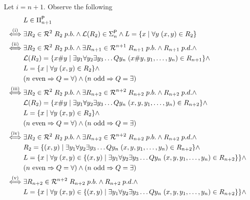 \documentclass [11pt]{article}
\newcommand{\ccfont}[1]{\protect\mathsf{#1}}
\newcommand{\Ptime}{\ccfont{P}}
\newcommand{\phs}[1]{\Sigma_{#1}^{\Ptime}}
\newcommand{\php}[1]{\Pi_{#1}^{\Ptime}}
\newcommand{\sto}{\Rightarrow}
\begin{document}
Let $i=n+1$. Observe the following
\begin{equation*}
\begin{split}
&L \in \php{n+1}\\
\stackrel{\text{(i)}}{\iff}& \exists R_2 \in \mathcal{R}^{2} \; R_2 \; p.b.  \land \mathcal{L}(R_2) \in \phs{n} \land L = \{x \mid \forall y \; (x,y) \in R_2\} \\
\stackrel{\text{(ii)}}{\iff} &\exists R_2 \in \mathcal{R}^{2} \; R_2 \; p.b.  \land  \exists R_{n+1}  \in  \mathcal{R}^{n+1} \; R_{n+1} \; p.b. \land R_{n+1} \; p.d. \land  \\
&\mathcal{L}(R_2) = \{x\#y \mid \exists y_1 \forall y_2\exists y_3\dots Q y_n  \; (x\#y,y_1,\ldots,y_n) \in R_{n+1}\}  \land \\
& L = \{x \mid \forall y \; (x,y) \in R_2\}  \land \\
&  (n \text{ even}  \sto Q=\forall )\land (n \text{ odd}  \sto Q=\exists )\\
\stackrel{\text{(iii)}}{\iff} &\exists R_2 \in \mathcal{R}^{2} \; R_2 \; p.b.  \land  \exists R_{n+2}  \in  \mathcal{R}^{n+2} \; R_{n+2} \; p.b. \land R_{n+2} \; p.d. \land  \\
&\mathcal{L}(R_2) = \{x\#y \mid \exists y_1 \forall y_2\exists y_3\dots Q y_n  \; (x,y,y_1,\ldots,y_n) \in R_{n+2}\}  \land \\ 
& L = \{x \mid \forall y \; (x,y) \in R_2\} \land  \\ 
&  (n \text{ even}  \sto Q=\forall )\land (n \text{ odd}  \sto Q=\exists )\\
\stackrel{\text{(iv)}}{\iff} &\exists R_2 \in \mathcal{R}^{2} \; R_2 \; p.b.  \land  \exists R_{n+2}  \in  \mathcal{R}^{n+2} \; R_{n+2} \; p.b. \land R_{n+2} \; p.d. \land  \\
&R_2 = \{(x,y) \mid \exists y_1 \forall y_2\exists y_3\dots Q y_n  \; (x,y,y_1,\ldots,y_n) \in R_{n+2}\}  \land\\ 
& L = \{x \mid \forall y \; (x,y) \in  \{(x,y) \mid \exists y_1 \forall y_2\exists y_3\dots Q y_n  \; (x,y,y_1,\ldots,y_n) \in R_{n+2}\}\}  \land  \\ 
&  (n \text{ even}  \sto Q=\forall )\land (n \text{ odd}  \sto Q=\exists )\\
\stackrel{\text{(v)}}{\iff} & \exists R_{n+2}  \in  \mathcal{R}^{n+2} \; R_{n+2} \; p.b. \land R_{n+2} \; p.d. \land  \\
& L = \{x \mid \forall y \; (x,y) \in  \{(x,y) \mid \exists y_1 \forall y_2\exists y_3\dots Q y_n  \; (x,y,y_1,\ldots,y_n) \in R_{n+2}\}\} \land  \\ 

\end{split}
\end{equation*}
\end{document}
